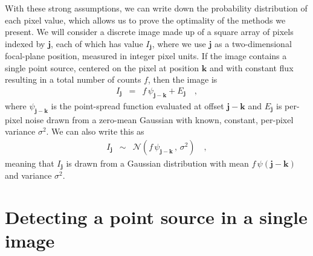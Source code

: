 \documentclass[11pt,letterpaper,linenumbers]{aastex7}
\newcommand{\equationname}{equation}
\newcommand{\eqnref}[1]{\mbox{\equationname~\ref{#1}}}
\newcommand{\drawnfrom}{\sim}
\newcommand{\gaussianN}{\mathcal{N}}
\newcommand{\gaussx}[2]{\gaussianN\!\left(#1 \, , \, #2\right)}
\newcommand{\psf}{\psi}
\newcommand{\psfat}[1]{\psf_{#1}}
\newcommand{\noise}{E}
\renewcommand{\vec}[1]{\boldsymbol{#1}}
\newcommand{\ivec}{\vec{i}}
\newcommand{\jvec}{\vec{j}}
\newcommand{\kvec}{\vec{k}}
\newcommand{\iina}{\ivec \,\, \mathrm{in} \,\, \mathcal{A}}
\begin{document}
With these strong assumptions, we can write down the probability
distribution of each pixel value, which allows us to prove the
optimality of the methods we present.
%
We will consider a discrete image made up of a square array of pixels
indexed by $\jvec$, each of which has value $I_{\jvec}$, where we
use $\jvec$ as a two-dimensional focal-plane position, measured in
integer pixel units.
%
If the image contains a single point source, centered on
the pixel at position $\kvec$ and with constant flux resulting in a
total number of counts $f$, then the image is
\begin{eqnarray}
  I_{\jvec} &=& f \, \psfat{\jvec - \kvec} + \noise_{\jvec} \quad ,
  \label{eqn:image}
\end{eqnarray}
where $\psfat{\jvec-\kvec}$ is the point-spread function evaluated at
offset $\jvec-\kvec$ and $\noise_{\jvec}$ is per-pixel noise drawn
from a zero-mean Gaussian with known, constant, per-pixel variance $\sigma^2$.
%
We can also write this as
\begin{eqnarray}
  I_{\jvec} &\drawnfrom& \gaussx{f \, \psfat{\jvec - \kvec}}{\sigma^2}
  \nonumber
  \quad ,
\end{eqnarray}
meaning that $I_{\jvec}$ is drawn from a Gaussian distribution with
mean $f\, \psf(\jvec - \kvec)$ and variance $\sigma^2$.


\section{Detecting a point source in a single image}
\label{sec:detection}



\end{document}
